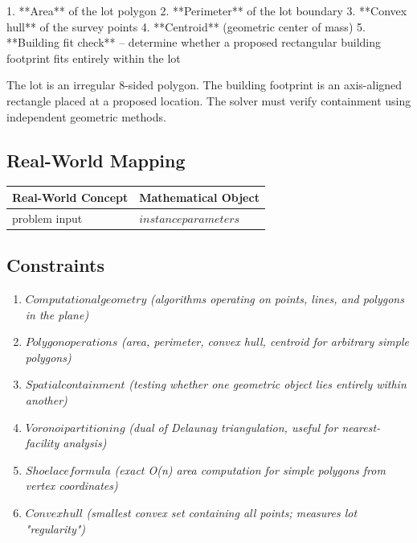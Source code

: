 \documentclass[11pt, a4paper]{article}
\begin{document}
1. **Area** of the lot polygon
2. **Perimeter** of the lot boundary
3. **Convex hull** of the survey points
4. **Centroid** (geometric center of mass)
5. **Building fit check** -- determine whether a proposed rectangular building footprint fits entirely within the lot

The lot is an irregular 8-sided polygon. The building footprint is an axis-aligned rectangle placed at a proposed location. The solver must verify containment using independent geometric methods.

\subsection{Real-World Mapping}

\begin{longtable}{ll}
\toprule
\textbf{Real-World Concept} & \textbf{Mathematical Object} \\
\midrule
\endhead
problem input & $instance parameters$ \\
\bottomrule
\end{longtable}

\subsection{Constraints}

\begin{enumerate}
  \item $Computational geometry$
  \hfill \textit{(algorithms operating on points, lines, and polygons in the plane)}
  \item $Polygon operations$
  \hfill \textit{(area, perimeter, convex hull, centroid for arbitrary simple polygons)}
  \item $Spatial containment$
  \hfill \textit{(testing whether one geometric object lies entirely within another)}
  \item $Voronoi partitioning$
  \hfill \textit{(dual of Delaunay triangulation, useful for nearest-facility analysis)}
  \item $Shoelace formula$
  \hfill \textit{(exact O(n) area computation for simple polygons from vertex coordinates)}
  \item $Convex hull$
  \hfill \textit{(smallest convex set containing all points; measures lot "regularity")}
\end{enumerate}
\end{document}
